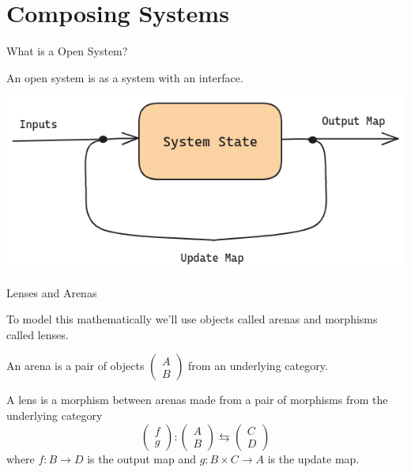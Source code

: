 \documentclass{beamer}
\begin{document}
\section{Composing Systems}
\begin{frame}{What is a Open System?}
    \begin{large}
        An open system is as a system with an interface.

    \end{large}

    \vspace*{0.25in}
    \begin{center}
        \includegraphics[scale=0.35]{system_diagram_open.png}
    \end{center}
\end{frame}


\begin{frame}{Lenses and Arenas}
    \begin{large}
        To model this mathematically we'll use objects called arenas and morphisms called lenses.

    \end{large}

    \vspace*{0.125in}
    \begin{definition}[Arenas]
        An arena is a pair of objects $\begin{pmatrix}A \\ B\end{pmatrix}$ from an underlying category.
    \end{definition}

    \begin{definition}
        A lens is a morphism between arenas made from a pair of morphisms from the underlying category
        $$\begin{pmatrix}f \\ g\end{pmatrix}: \begin{pmatrix}A \\ B\end{pmatrix} \leftrightarrows \begin{pmatrix}C \\ D\end{pmatrix}$$
        where $f:B\rightarrow D$ is the output map and $g:B\times C \rightarrow A$ is the update map.
    \end{definition}
\end{frame}
\end{document}
